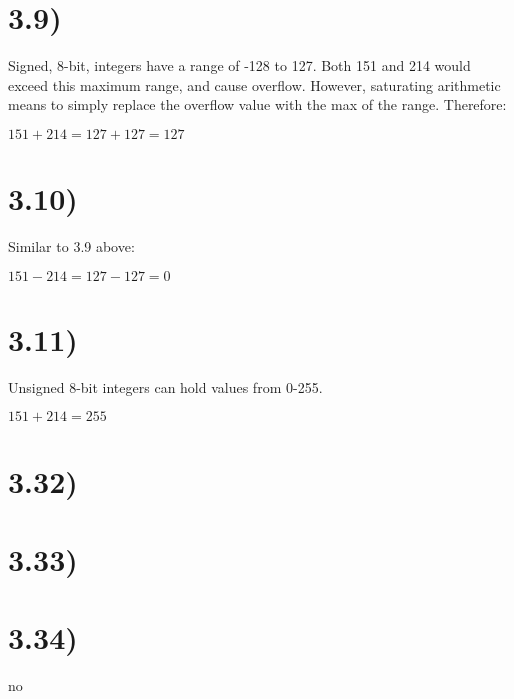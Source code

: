 \documentclass[a4paper,11pt]{article}
\begin{document}

\section*{3.9)} 
Signed, 8-bit, integers have a range of -128 to 127.  Both 151 and 214 would exceed this maximum range, and cause overflow.  However, saturating arithmetic means to simply replace the overflow value with the max of the range.  Therefore:

$151+214=127+127=127$


\section*{3.10)} 
Similar to 3.9 above:

$151-214=127-127=0$


\section*{3.11)} 
Unsigned 8-bit integers can hold values from 0-255.

$151+214=255$


\section*{3.32)} 


\section*{3.33)} 


\section*{3.34)} 
no

\end{document}
